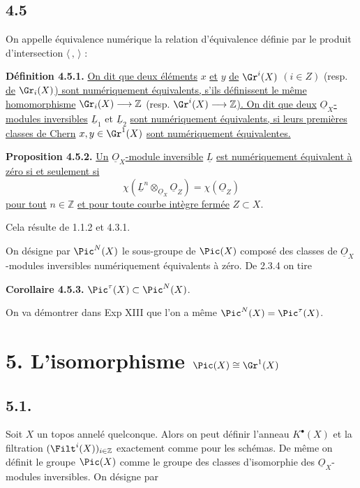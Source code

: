 
\subsection*{4.5}
On
appelle équivalence numérique la relation d'équivalence définie par le produit d'intersection \(\langle\, ,\,\rangle\) :

\textbf{Définition 4.5.1.} \uline{On dit que deux éléments} \(x\) \uline{et} \(y\) \uline{de} \(\Gr^i(X)\) \((i\in Z)\) (resp. \uline{de} \(\Gr_i(X)\)\uline{) sont numériquement équivalents, s'ils définissent le même homomorphisme} \(\Gr_i(X)\longrightarrow\mathbb Z\) (resp. \(\Gr^i(X)\longrightarrow\mathbb Z\)\uline{).
On dit que deux} \(\underline{O}_X\)\uline{-modules inversibles} \(\underline{L}_1\) et \(\underline{L}_2\) \uline{sont numériquement équivalents, si leurs premières classes de Chern} \(x,y\in\Gr^1(X)\) \uline{sont numériquement équivalentes.}

\textbf{Proposition 4.5.2.} \uline{Un} \(\underline{O}_X\)\uline{-module inversible} \(\underline{L}\) \uline{est numériquement équivalent à zéro si et seulement si}
\begin{equation}\tag{4.5.3}
 \chi(\underline{L}^n\otimes_{\underline{O}_X}\underline{O}_Z)=\chi(\underline{O}_Z)
\end{equation}
\uline{pour tout} \(n\in\mathbb Z\) \uline{et pour toute courbe intègre fermée} \(Z\subset X\).

Cela résulte de 1.1.2 et 4.3.1.

On désigne par \(\Pic^N(X)\) le sous-groupe de \(\Pic(X)\) composé des classes de \(\underline{O}_X\)-modules inversibles numériquement équivalents à zéro. De 2.3.4 on tire

\textbf{Corollaire 4.5.3.} \(\Pic^\tau(X)\subset \Pic^N(X)\).

On va démontrer dans Exp XIII que l'on a même \(\Pic^N(X)=\Pic^\tau(X)\).

\section*{5. L'isomorphisme \(\Pic(X)\cong\Gr^1(X)\)}

\subsection*{5.1.}
Soit \(X\) un topos annelé quelconque. Alors on peut définir l'anneau \(K^{\bullet}(X)\) et la filtration \((\Filt^i(X))_{i\in\mathbb Z}\) exactement comme pour les schémas. De même on définit le groupe \(\Pic(X)\) comme le groupe des classes d'isomorphie des \(\underline{O}_X\)-modules inversibles. On désigne par
